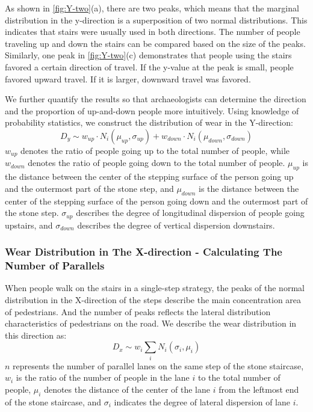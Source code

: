 \documentclass[12pt]{article}  %
\numberwithin{equation}{section} %
\begin{document}
As shown in \autoref{fig:Y-two}(a),  there are two peaks, which means that the marginal distribution in the y-direction is a superposition of two normal distributions. This indicates that stairs were usually used in both directions. The number of people traveling up and down the stairs can be compared based on the size of the peaks. Similarly, one peak in \autoref{fig:Y-two}(c) demonstrates that people using the stairs favored a certain direction of travel. If the y-value at the peak is small, people favored upward travel. If it is larger, downward travel was favored.


We further quantify the results so that archaeologists can determine the direction and the proportion of up-and-down people more intuitively. Using knowledge of probability statistics, we construct the distribution of wear in the Y-direction:
\begin{equation}
D_{y}\sim w_{up}\cdot N_i(\mu_{up},\sigma_{up})+w_{down}\cdot N_i(\mu_{down},\sigma_{down})
\end{equation}
$w_{up}$ denotes the ratio of people going up to the total number of people, while $w_{down}$ denotes the ratio of people going down to the total number of people. $\mu_{up}$ is the distance between the center of the stepping surface of the person going up and the outermost part of the stone step, and $\mu_{down}$ is the distance between the center of the stepping surface of the person going down and the outermost part of the stone step. $\sigma_{up}$ describes the degree of longitudinal dispersion of people going upstairs, and $\sigma_{down}$ describes the degree of vertical dispersion downstairs. 
\subsubsection{Wear Distribution in The X-direction - Calculating The Number of Parallels}
When people walk on the stairs in a single-step strategy, the peaks of the normal distribution in the X-direction of the steps describe the main concentration area of pedestrians. And the number of peaks reflects the lateral distribution characteristics of pedestrians on the road. We describe the wear distribution in this direction as:
\begin{equation}
    D_{x}\sim w_i\sum_{i}N_i(\sigma_i,\mu_i)
\end{equation}
$n$ represents the number of parallel lanes on the same step of the stone staircase, $w_i$ is the ratio of the number of people in the lane $i$ to the total number of people,  $\mu_i$ denotes the distance of the center of the lane $i$ from the leftmost end of the stone staircase, and $\sigma_i$ indicates the degree of lateral dispersion of lane $i$.
\end{document}
